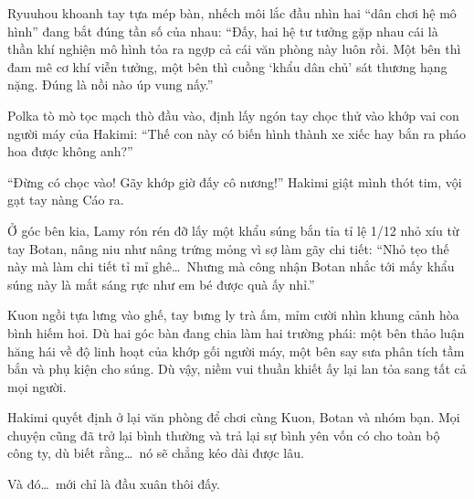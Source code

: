 \documentclass[../main.tex]{subfiles}
\begin{document}
Ryuuhou khoanh tay tựa mép bàn, nhếch môi lắc đầu nhìn hai ``dân chơi hệ mô hình'' đang bắt đúng tần số của nhau: ``Đấy, hai hệ tư tưởng gặp nhau cái là thần khí nghiện mô hình tỏa ra ngợp cả cái văn phòng này luôn rồi. Một bên thì đam mê cơ khí viễn tưởng, một bên thì cuồng `khẩu dân chủ' sát thương hạng nặng. Đúng là nồi nào úp vung nấy.''

Polka tò mò tọc mạch thò đầu vào, định lấy ngón tay chọc thử vào khớp vai con người máy của Hakimi: ``Thế con này có biến hình thành xe xiếc hay bắn ra pháo hoa được không anh?''

``Đừng có chọc vào! Gãy khớp giờ đấy cô nương!'' Hakimi giật mình thót tim, vội gạt tay nàng Cáo ra.

Ở góc bên kia, Lamy rón rén đỡ lấy một khẩu súng bắn tỉa tỉ lệ 1/12 nhỏ xíu từ tay Botan, nâng niu như nâng trứng mỏng vì sợ làm gãy chi tiết: ``Nhỏ tẹo thế này mà làm chi tiết tỉ mỉ ghê\dots\ Nhưng mà công nhận Botan nhắc tới mấy khẩu súng này là mắt sáng rực như em bé được quà ấy nhỉ.''

Kuon ngồi tựa lưng vào ghế, tay bưng ly trà ấm, mỉm cười nhìn khung cảnh hòa bình hiếm hoi. Dù hai góc bàn đang chia làm hai trường phái: một bên thảo luận hăng hái về độ linh hoạt của khớp gối người máy, một bên say sưa phân tích tầm bắn và phụ kiện cho súng. Dù vậy, niềm vui thuần khiết ấy lại lan tỏa sang tất cả mọi người.

Hakimi quyết định ở lại văn phòng để chơi cùng Kuon, Botan và nhóm bạn. Mọi chuyện cũng đã trở lại bình thường và trả lại sự bình yên vốn có cho toàn bộ công ty, dù biết rằng\dots\ nó sẽ chẳng kéo dài được lâu.

Và đó\dots\ mới chỉ là đầu xuân thôi đấy.
\end{document}
